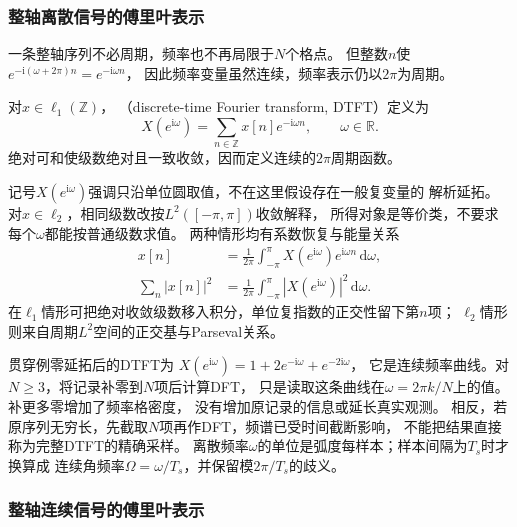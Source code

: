 \subsubsection{整轴离散信号的傅里叶表示}

一条整轴序列不必周期，频率也不再局限于$N$个格点。
但整数$n$使$e^{-\mathrm i(\omega+2\pi)n}=e^{-\mathrm i\omega n}$，
因此频率变量虽然连续，频率表示仍以$2\pi$为周期。
\begin{definition}[离散时间傅里叶变换]
  \label{def:signal-analysis-dtft}
  对$x\in\ell_1(\mathbb Z)$，
  （discrete-time Fourier transform, DTFT）定义为
  \begin{equation}
    X(e^{\mathrm i\omega})=\sum_{n\in\mathbb Z}x[n]e^{-\mathrm i\omega n},
    \qquad \omega\in\mathbb R.
    \label{eq:signal-analysis-dtft}
  \end{equation}
  绝对可和使级数绝对且一致收敛，因而定义连续的$2\pi$周期函数。
\end{definition}
记号$X(e^{\mathrm i\omega})$强调只沿单位圆取值，不在这里假设存在一般复变量的
解析延拓。对$x\in\ell_2$，相同级数改按$L^2([-\pi,\pi])$收敛解释，
所得对象是等价类，不要求每个$\omega$都能按普通级数求值。
两种情形均有系数恢复与能量关系
\begin{align*}
  x[n]&=\frac1{2\pi}\int_{-\pi}^{\pi}
  X(e^{\mathrm i\omega})e^{\mathrm i\omega n}\,\mathrm d\omega,\\
  \sum_n|x[n]|^2&=\frac1{2\pi}\int_{-\pi}^{\pi}|X(e^{\mathrm i\omega})|^2\,\mathrm d\omega.
\end{align*}
在$\ell_1$情形可把绝对收敛级数移入积分，单位复指数的正交性留下第$n$项；
$\ell_2$情形则来自周期$L^2$空间的正交基与Parseval关系。

贯穿例零延拓后的DTFT为
$X(e^{\mathrm i\omega})=1+2e^{-\mathrm i\omega}+e^{-2\mathrm i\omega}$，
它是连续频率曲线。对$N\geq3$，将记录补零到$N$项后计算DFT，
只是读取这条曲线在$\omega=2\pi k/N$上的值。补更多零增加了频率格密度，
没有增加原记录的信息或延长真实观测。
相反，若原序列无穷长，先截取$N$项再作DFT，频谱已受时间截断影响，
不能把结果直接称为完整DTFT的精确采样。
离散频率$\omega$的单位是弧度每样本；样本间隔为$T_s$时才换算成
连续角频率$\Omega=\omega/T_s$，并保留模$2\pi/T_s$的歧义。

\subsubsection{整轴连续信号的傅里叶表示}

